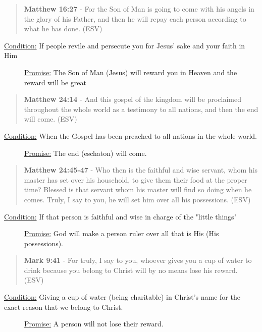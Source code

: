 \documentclass[11pt]{article}
\begin{document}
\begin{quote}
\textbf{Matthew 16:27} - For the Son of Man is going to come with his angels in the glory of his Father, and then he will repay each person according to what he has done. (ESV)
\end{quote}

\begin{description}
\item[{\uline{Condition:} If people revile and persecute you for Jesus' sake and your faith in Him}] \uline{Promise:} The Son of Man (Jesus) will reward you in Heaven and the reward will be great
\end{description}

\begin{quote}
\textbf{Matthew 24:14} - And this gospel of the kingdom will be proclaimed throughout the whole world as a testimony to all nations, and then the end will come. (ESV)
\end{quote}

\begin{description}
\item[{\uline{Condition:} When the Gospel has been preached to all nations in the whole world.}] \uline{Promise:} The end (eschaton) will come.
\end{description}

\begin{quote}
\textbf{Matthew 24:45-47} - Who then is the faithful and wise servant, whom his master has set over his household, to give them their food at the proper time? Blessed is that servant whom his master will find so doing when he comes. Truly, I say to you, he will set him over all his possessions. (ESV)
\end{quote}

\begin{description}
\item[{\uline{Condition:} If that person is faithful and wise in charge of the "little things"}] \uline{Promise:} God will make a person ruler over all that is His (His possessions).
\end{description}

\begin{quote}
\textbf{Mark 9:41} - For truly, I say to you, whoever gives you a cup of water to drink because you belong to Christ will by no means lose his reward. (ESV)
\end{quote}

\begin{description}
\item[{\uline{Condition:} Giving a cup of water (being charitable) in Christ's name for the exact reason that we belong to Christ.}] \uline{Promise:} A person will not lose their reward.
\end{description}
\end{document}
